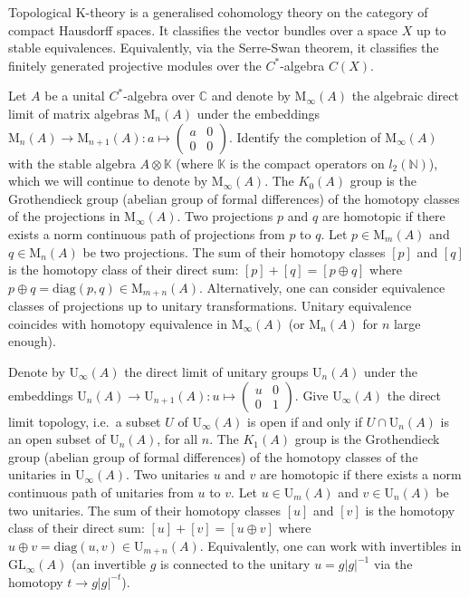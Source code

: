 \documentclass[12pt]{article}
\newcommand*{\Nset}{\mathbb{N}}
\newcommand*{\Cset}{\mathbb{C}}
\newcommand*{\Kset}{\mathbb{K}}
\newcommand*{\GLgrp}{\mathrm{GL}}
\newcommand*{\Ugrp}{\mathrm{U}}
\newcommand*{\Matrix}[2]{\mathord{\mathrm{M}_{#1}(#2)}}
\theoremstyle{inlinedefn}
\theoremstyle{break}
\begin{document}
Topological K-theory is a generalised cohomology theory on the category
of compact Hausdorff spaces.
It classifies the vector bundles over a space $X$ up to stable equivalences.
Equivalently, via the Serre-Swan theorem, it classifies the finitely generated projective modules over the $C^*$-algebra $C(X)$.

Let $A$ be a unital $C^*$-algebra over $\Cset$ and denote by $\Matrix{\infty}{A}$ the algebraic direct limit of matrix algebras $\Matrix{n}{A}$ under the embeddings
$\Matrix{n}{A} \to \Matrix{n+1}{A} : a \mapsto \left(\begin{array}{cc} a & 0 \\ 0 & 0 \end{array}\right)$.
Identify the completion of $\Matrix{\infty}{A}$ with the stable algebra $A\otimes\Kset$ (where $\Kset$ is the compact operators on $l_2(\Nset)$),
which we will continue to denote by $\Matrix{\infty}{A}$.
The $K_0(A)$ group is the Grothendieck group (abelian group of formal differences) of the homotopy classes of the projections in $\Matrix{\infty}{A}$.
Two projections $p$ and $q$ are homotopic if there exists a norm continuous path of projections from $p$ to $q$.
Let $p \in \Matrix{m}{A}$ and $q \in \Matrix{n}{A}$ be two projections.
The sum of their homotopy classes $[p]$ and $[q]$ is the homotopy class of their direct sum:
$[p]+[q] = [p \oplus q]$ where $p \oplus q = \mathrm{diag}(p,q) \in \Matrix{m+n}{A}$.
Alternatively, one can consider equivalence classes of projections up to unitary transformations.
Unitary equivalence coincides with homotopy equivalence in $\Matrix{\infty}{A}$ (or $\Matrix{n}{A}$ for $n$ large enough).

Denote by $\Ugrp_\infty(A)$ the direct limit of unitary groups $\Ugrp_n(A)$ under the embeddings
$\Ugrp_n(A) \to \Ugrp_{n+1}(A) : u \mapsto \left(\begin{array}{cc} u & 0 \\ 0 & 1 \end{array}\right)$.
Give $\Ugrp_\infty(A)$ the direct limit topology, i.e.\
a subset $U$ of $\Ugrp_\infty(A)$ is open if and only if
$U \cap \Ugrp_n(A)$ is an open subset of $\Ugrp_n(A)$, for all $n$.
The $K_1(A)$ group is the Grothendieck group (abelian group of formal differences) of the homotopy classes of the unitaries in $\Ugrp_\infty(A)$.
Two unitaries $u$ and $v$ are homotopic if there exists a norm continuous path of unitaries from $u$ to $v$.
Let $u \in \Ugrp_m(A)$ and $v \in \Ugrp_n(A)$ be two unitaries.
The sum of their homotopy classes $[u]$ and $[v]$ is the homotopy class of their direct sum:
$[u]+[v] = [u \oplus v]$ where $u \oplus v = \mathrm{diag}(u,v) \in \Ugrp_{m+n}(A)$.
Equivalently, one can work with invertibles in $\GLgrp_\infty(A)$
(an invertible $g$ is connected to the unitary $u = g|g|^{-1}$ via the homotopy $t \to g|g|^{-t}$).
\end{document}
